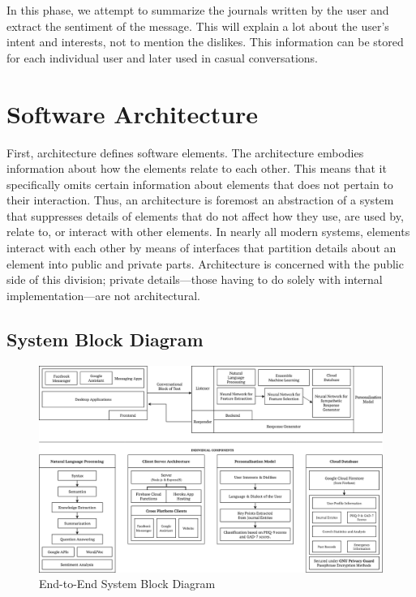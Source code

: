 In this phase, we attempt to summarize the journals written by the user and extract the sentiment of the message. This will explain a lot about the user’s intent and interests, not to mention the dislikes. This information can be stored for each individual user and later used in casual conversations.

\pagebreak

\section{Software Architecture}

First, architecture defines software elements. The architecture embodies information about how the elements relate to each other. This
means that it specifically omits certain information about elements that does not pertain to their interaction. Thus, an architecture is
foremost an abstraction of a system that suppresses details of elements that do not affect how they use, are used by, relate to, or interact
with other elements. In nearly all modern systems, elements interact with each other by means of interfaces that partition details about an
element into public and private parts. Architecture is concerned with the public side of this division; private details—those having to do
solely with internal implementation—are not architectural.

\subsection{System Block Diagram}

\begin{figure}[H]
    \centering
    \includegraphics[width=\linewidth]{images/system-block-diagram.png}
    \caption{End-to-End System Block Diagram}
    \label{fig:system-block-diagram}
\end{figure}

